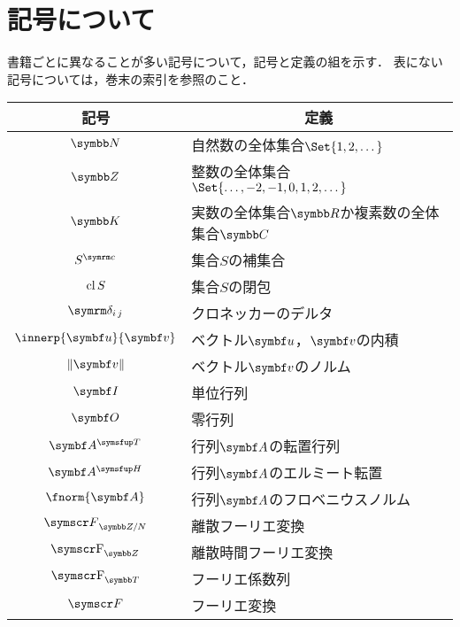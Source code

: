 \documentclass[../../main]{subfiles}
\begin{document}
\chapter{記号について}
\thispagestyle{empty}
書籍ごとに異なることが多い記号について，記号と定義の組を示す．
表にない記号については，巻末の索引を参照のこと．

\vspace*{\fill}
\begin{table*}
  \centering
  \begin{tabular}{c|l} \hline
    記号 & \multicolumn{1}{c}{定義} \\ \hline
    \(\numset{N}\) & 自然数の全体集合\(\Set{1,2,\dotsc}\) \\
    \(\numset{Z}\) & 整数の全体集合\(\Set{\dotsc,-2,-1,0,1,2,\dotsc}\) \\
    \(\numset{K}\) & 実数の全体集合\(\numset{R}\)か複素数の全体集合\(\numset{C}\) \\
    \(\scomp{S}\) & 集合\(S\)の補集合 \\
    \(\operatorname{cl} S\) & 集合\(S\)の閉包 \\
    \(\kdelta{i}{j}\) & クロネッカーのデルタ \\
    \(\innerp{\vect{u}}{\vect{v}}\) & ベクトル\(\vect{u}\)，\(\vect{v}\)の内積 \\
    \(\vnorm{\vect{v}}\) & ベクトル\(\vect{v}\)のノルム \\
    \(\imat\) & 単位行列 \\
    \(\zmat\) & 零行列 \\
    \(\trps{\mat{A}}\) & 行列\(\mat{A}\)の転置行列 \\
    \(\htrps{\mat{A}}\) & 行列\(\mat{A}\)のエルミート転置 \\
    \(\fnorm{\mat{A}}\) & 行列\(\mat{A}\)のフロベニウスノルム \\
    \(\dft{N}\) & 離散フーリエ変換 \\
    \(\dtft\) & 離散時間フーリエ変換 \\
    \(\fseries\) & フーリエ係数列 \\
    \(\ftrans\) & フーリエ変換 \\ \hline
  \end{tabular}
\end{table*}
\vspace*{\fill}
\end{document}
